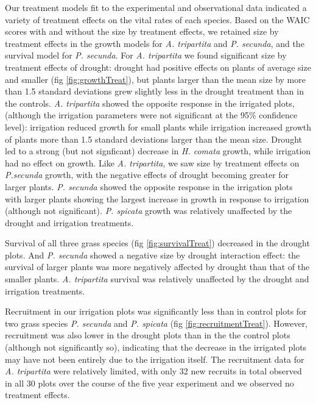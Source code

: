 \documentclass[11pt]{article}
\begin{document}
\begin{doublespacing}
Our treatment models fit to the experimental and observational data indicated a variety of treatment effects on the vital rates of each species. Based on the WAIC scores with and without the size by treatment effects, we retained size by treatment effects in the growth models for \textit{A. tripartita} and \textit{P. secunda}, and the survival model for \textit{P. secunda}. For \textit{A. tripartita} we found significant size by treatment effects of drought: drought had positive effects on plants of average size and smaller (fig \ref{fig:growthTreat}), but plants larger than the mean size by more than 1.5 standard deviations grew slightly less in the drought treatment than in the controls. \textit{A. tripartita} showed the opposite response in the irrigated plots, (although the irrigation parameters were not significant at the 95\% confidence level): irrigation reduced growth for small plants while irrigation increased growth of plants more than 1.5 standard deviations larger than the mean size. Drought led to a strong (but not signficant) decrease in \textit{H. comata} growth, while irrigation had no effect on growth.  Like \textit{A. tripartita}, we saw size by treatment effects on \textit{P.secunda} growth, with the negative effects of drought becoming greater for larger plants. \textit{P. secunda} showed the opposite response in the irrigation plots with larger plants showing the largest increase in growth in response to irrigation (although not significant). \textit{P. spicata} growth was relatively unaffected by the drought and irrigation treatments. 

Survival of all three grass species (fig \ref{fig:survivalTreat}) decreased in the drought plots. And \textit{P. secunda} showed a negative size by drought interaction effect: the survival of larger plants was more negatively affected by drought than that of the smaller plants. \textit{A. tripartita} survival was relatively unaffected by the drought and irrigation treatments.

Recruitment in our irrigation plots was significantly less than in control plots for two grass species \textit{P. secunda} and \textit{P. spicata} (fig \ref{fig:recruitmentTreat}). However, recruitment was also lower in the drought plots than in the the control plots (although not significantly so), indicating that the decrease in the irrigated plots may have not been entirely due to the irrigation itself. The recruitment data for \textit{A. tripartita} were relatively limited, with only 32 new recruits in total observed in all 30 plots over the course of the five year experiment and we observed no treatment effects.


\end{doublespacing}
\end{document}
